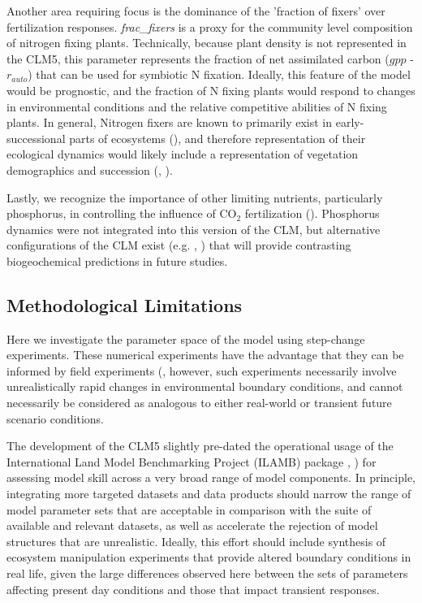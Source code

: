 \documentclass[draft,linenumbers]{agujournal}
\begin{document}
Another area requiring focus is the dominance of the 'fraction of fixers' over fertilization responses. \emph{frac\_fixers} is a proxy for the community level composition of nitrogen fixing plants. Technically, because plant density is not represented in the CLM5, this parameter represents the fraction of net assimilated carbon ($gpp$ - $r_{auto}$) that can be used for symbiotic N fixation. Ideally, this feature of the model would be prognostic, and the fraction of N fixing plants would respond to changes in environmental conditions and the relative competitive abilities of N fixing plants. In general, Nitrogen fixers are known to primarily exist in early-successional parts of ecosystems (\cite{vitousek1989}), and therefore representation of their ecological dynamics would likely include a representation of vegetation demographics and succession (\cite{fisher2018vegetation}, \cite{trugman2016climate}). 

Lastly, we recognize the importance of other limiting nutrients, particularly phosphorus, in controlling the influence of CO$_{2}$ fertilization (\cite{reed2015}). Phosphorus dynamics were not integrated into this version of the CLM, but alternative configurations of the CLM exist (e.g. \cite{yang2014}, \cite{zhu2016}) that will provide contrasting biogeochemical predictions in future studies.  



\subsection{ Methodological Limitations}
Here we investigate the parameter space of the model using step-change experiments. These numerical experiments have the advantage that they can be informed by field experiments (\cite{wieder2019}, however, such experiments necessarily involve unrealistically rapid changes in environmental boundary conditions, and cannot necessarily be considered as analogous to either real-world or transient future scenario conditions. 

The development of the CLM5 slightly pre-dated the operational usage of the International Land Model Benchmarking Project (ILAMB) package \cite{collier2018}, \cite{lawrence2018}) for assessing model skill across a very broad range of model components.  In principle, integrating more targeted datasets and data products should narrow the range of model parameter sets that are acceptable in comparison with the suite of available and relevant datasets, as well as accelerate the rejection of model structures that are unrealistic. Ideally, this effort should include synthesis of ecosystem manipulation experiments that provide altered boundary conditions in real life, given the large differences observed here between the sets of parameters affecting present day conditions and those that impact transient responses.
\end{document}
